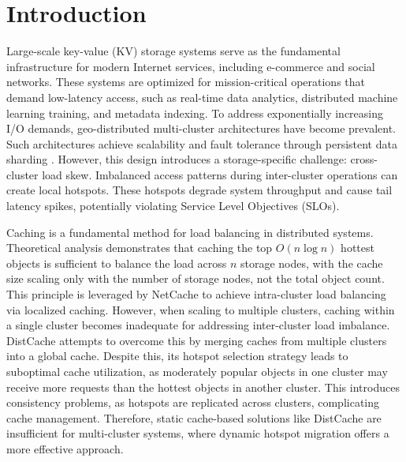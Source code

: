 \documentclass[conference]{IEEEtran}
\begin{document}
\section{Introduction}

Large-scale key-value (KV) storage systems serve as the fundamental infrastructure for modern Internet services, including e-commerce and social networks. These systems are optimized for mission-critical operations that demand low-latency access, such as real-time data analytics, distributed machine learning training, and metadata indexing\cite{anwar2020customizable,wang2017metakv,8932384}. To address exponentially increasing I/O demands, geo-distributed multi-cluster architectures have become prevalent. Such architectures achieve scalability and fault tolerance through persistent data sharding \cite{decandia2007dynamo,nishtala2013scaling,10204945}. However, this design introduces a storage-specific challenge: cross-cluster load skew. Imbalanced access patterns during inter-cluster operations can create local hotspots. These hotspots degrade system throughput and cause tail latency spikes, potentially violating Service Level Objectives (SLOs)\cite{hong2013understanding, dean2013tail, 10758435,10830580}.

Caching is a fundamental method for load balancing in distributed systems. Theoretical analysis demonstrates that caching the top \(O (n \log n)\) hottest objects is sufficient to balance the load across $n$ storage nodes, with the cache size scaling only with the number of storage nodes, not the total object count\cite{fan2011small}. This principle is leveraged by NetCache\cite{jin2017netcache} to achieve intra-cluster load balancing via localized caching. However, when scaling to multiple clusters, caching within a single cluster becomes inadequate for addressing inter-cluster load imbalance. DistCache\cite{liu2019distcache} attempts to overcome this by merging caches from multiple clusters into a global cache. Despite this, its hotspot selection strategy leads to suboptimal cache utilization, as moderately popular objects in one cluster may receive more requests than the hottest objects in another cluster. This introduces consistency problems, as hotspots are replicated across clusters, complicating cache management. Therefore, static cache-based solutions like DistCache are insufficient for multi-cluster systems, where dynamic hotspot migration offers a more effective approach.
\end{document}
